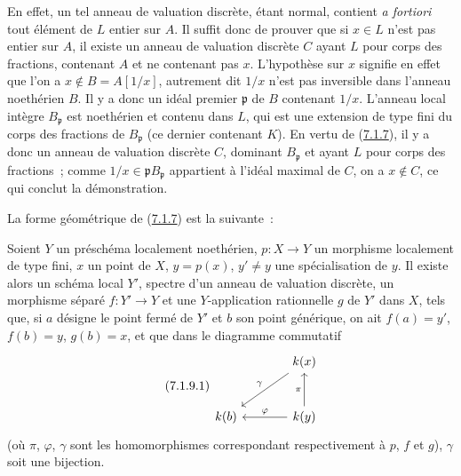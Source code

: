 En effet, un tel anneau de valuation discrète, étant normal, contient
\emph{a fortiori} tout élément de $L$ entier sur $A$. Il suffit donc de
prouver que si $x\in L$ n'est pas entier sur $A$, il existe un anneau de
valuation discrète $C$ ayant $L$ pour corps des fractions, contenant $A$ et
ne contenant pas $x$. L'hypothèse sur $x$ signifie en effet que l'on a
$x\notin B=A[1/x]$, autrement dit $1/x$ n'est pas inversible dans l'anneau
noethérien $B$. Il y a donc un idéal premier $\mathfrak{p}$ de $B$ contenant
$1/x$. L'anneau local intègre $B_{\mathfrak{p}}$ est noethérien et contenu
dans $L$, qui est une extension de type fini du corps des fractions de
$B_{\mathfrak{p}}$ (ce dernier contenant $K$). En vertu de
(\hyperref[II.7.1.7-fr]{7.1.7}), il y a donc un anneau de valuation discrète
$C$, dominant $B_{\mathfrak{p}}$ et ayant $L$ pour corps des fractions~;
comme $1/x\in\mathfrak{p}B_{\mathfrak{p}}$ appartient à l'idéal maximal de
$C$, on a $x\notin C$, ce qui conclut la démonstration.

La forme géométrique de (\hyperref[II.7.1.7-fr]{7.1.7}) est la suivante~:

\begin{proposition}[7.1.9]
\label{II.7.1.9-fr}
Soient $Y$ un préschéma localement noethérien, $p:X\to Y$ un morphisme
localement de type fini, $x$ un point de $X$, $y=p(x)$, $y'\neq y$ une
spécialisation de $y$. Il existe alors un schéma local $Y'$, spectre d'un
anneau de valuation discrète, un morphisme séparé $f:Y'\to Y$ et une
$Y$-application rationnelle $g$ de $Y'$ dans $X$, tels que, si $a$ désigne le
point fermé de $Y'$ et $b$ son point générique, on ait $f(a)=y'$,
$f(b)=y$, $g(b)=x$, et que dans le diagramme commutatif
\[
\tag{7.1.9.1}
\label{II.7.1.9.1-fr}
\begin{tikzcd}[column sep=large,row sep=large]
& k(x) \arrow[dl,"\gamma"'] \\
k(b) & k(y) \arrow[u,"\pi"] \arrow[l,"\varphi"']
\end{tikzcd}
\]
(où $\pi$, $\varphi$, $\gamma$ sont les homomorphismes correspondant
respectivement à $p$, $f$ et $g$), $\gamma$ soit une bijection.
\end{proposition}

